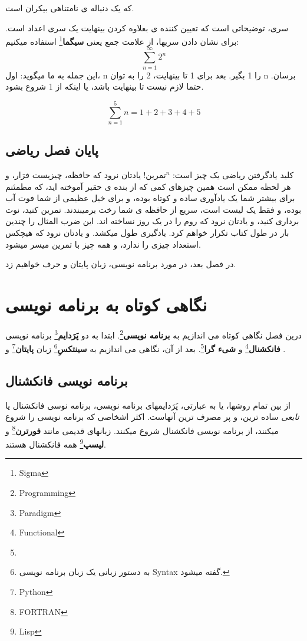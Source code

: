 \documentclass[14pt,a4paper]{memoir}
\begin{document}
	 که یک دنباله ی نامتناهی بیکران است. 
	 
	 
	 سری، توضیحاتی است که تعیین کننده ی بعلاوه کردن بینهایت یک سری اعداد است. برای نشان دادن سریها، از علامت جمع یعنی \textbf{سیگما}\footnote{Sigma} استفاده میکنیم:
	 \[  \sum_{n = 1}^{\infty} 2^n  \]
	 این جمله به ما میگوید: اول، n را 1 بگیر. بعد برای 1 تا بینهایت، 2 را به توان n برسان. حتما لازم نیست تا بینهایت باشد، یا اینکه از 1 شروع بشود.
	 
	 \[ \sum_{n = 1}^{5} n = 1+2+3+4+5 \]
	 
\section{پایان فصل ریاضی}\label{mathend}

کلید یادگرفتن ریاضی یک چیز است: $  \text{تمرین}^n  $! یادتان نرود که حافظه، چیزیست فرَار، و هر لحظه ممکن است همین چیزهای کمی که از بنده ی حقیر آموخته اید، که مطمئنم برای بیشتر شما یک یادآوری ساده و کوتاه بوده، و برای خیل عظیمی از شما فوت آب بوده، و فقط یک لیست است، سریع از حافظه ی شما رخت برمیبندند. تمرین کنید، نوت برداری کنید، و یادتان نرود که روم را در یک روز نساخته اند. این ضرب المثال را چندین بار در طول کتاب تکرار خواهم کرد. یادگیری طول میکشد. و یادتان نرود که هیچکس استعداد چیزی را ندارد، و همه چیز با تمرین میسر میشود.

در فصل بعد، در مورد برنامه نویسی، زبان پایتان و  حرف خواهیم زد.
	 
	   
	 \chapter{نگاهی کوتاه به برنامه نویسی}\label{programming}
	 
	 درین فصل نگاهی کوتاه می اندازیم به \textbf{برنامه نویسی}\footnote{Programming}. ابتدا به دو \textbf{پَرَدایم}\footnote{Paradigm} برنامه نویسی \textbf{فانکشنال}\footnote{Functional} و \textbf{شیء گرا}\footnote{}. بعد از آن، نگاهی می اندازیم به \textbf{سینتکسِ}\footnote{به دستور زبانی یک زبان برنامه نویسی Syntax گفته میشود.} زبان \textbf{پایتان}\footnote{Python} و \textbf{}.
	 
\section{برنامه نویسی فانکشنال}\label{functional}

از بین تمام روشها، یا به عبارتی، پَرَدایمهای برنامه نویسی، برنامه نوسی فانکشنال یا \textit{تابعی} ساده ترین، و پر مصرف ترین آنهاست. اکثر اشخاصی که برنامه نویسی را شروع میکنند، از برنامه نویسی فانکشنال شروع میکنند. زبانهای قدیمی مانند \textbf{فورترن}\footnote{FORTRAN}	و \textbf{لیسپ}\footnote{Lisp} همه فانکشنال هستند. 
\end{document}
